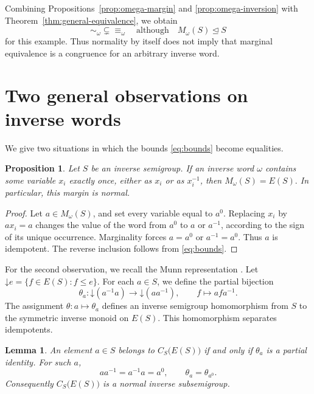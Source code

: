 \documentclass[11pt,a4paper,reqno]{amsart}
\newtheorem{lemma}[theorem]{Lemma}
\newtheorem{proposition}[theorem]{Proposition}
\newcommand{\E}{E}
\newcommand{\cent}[1]{C_{#1}\bigl(E(#1)\bigr)}
\numberwithin{equation}{section}
\begin{document}
Combining Propositions~\ref{prop:omega-margin} and \ref{prop:omega-inversion} with Theorem~\ref{thm:general-equivalence}, we obtain
\[
\sim_\omega\subsetneq\equiv_\omega
\quad\text{although}\quad
M_\omega(S)\trianglelefteq S
\]
for this example. Thus normality by itself does not imply that marginal equivalence is a congruence for an arbitrary inverse word.



\section{Two general observations on inverse words}\label{sec:generality}

We give two situations in which the bounds \eqref{eq:bounds} become equalities.

\begin{proposition}\label{prop:single}
Let $S$ be an inverse semigroup. If an inverse word $\omega$ contains some variable $x_i$ exactly once, either as $x_i$ or as $x_i^{-1}$, then $M_\omega(S)=\E(S).$ In particular, this margin is normal.
\end{proposition}

\begin{proof}
Let $a\in M_\omega(S)$, and set every variable equal to $a^0$. Replacing $x_i$ by $ax_i=a$ changes the value of the word from $a^0$ to $a$ or $a^{-1}$, according to the sign of its unique occurrence. Marginality forces $a=a^0$ or $a^{-1}=a^0$. Thus $a$ is idempotent. The reverse inclusion follows from \eqref{eq:bounds}.
\end{proof}

For the second observation, we recall the Munn representation \cite{Lawson}. Let $\mathord{\downarrow}e=\{f\in\E(S):f\le e\}$. For each $a\in S$, we define the partial bijection
\[
\theta_a\colon \mathord{\downarrow}(a^{-1}a) \longrightarrow \mathord{\downarrow}(aa^{-1}),
\qquad f\longmapsto afa^{-1}.
\]
The assignment $\theta\colon a\mapsto\theta_a$ defines an inverse semigroup homomorphism from $S$ to the symmetric inverse monoid on $\E(S)$. This homomorphism separates idempotents.

\begin{lemma}\label{lem:centralizer}
An element $a\in S$ belongs to $\cent S$ if and only if $\theta_a$ is a partial identity. For such $a$,
\[
aa^{-1}=a^{-1}a=a^0,\qquad \theta_a=\theta_{a^0}.
\]
Consequently $\cent S$ is a normal inverse subsemigroup.
\end{lemma}
\end{document}
